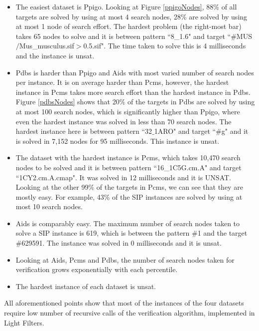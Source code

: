 \documentclass{l4proj}
\newcounter{example}[section]
\begin{document}
\begin{itemize}
\item The easiest dataset is Ppigo. Looking at Figure \ref{ppigoNodes}, 88\% of all targets are solved by using at most 4 search nodes, 28\% are solved by using at most 1 node of search effort. The hardest problem (the right-most bar) takes 65 nodes to solve and it is between pattern ``8\_1.6" and target ``\#MUS$/$Mus\_musculus.sif$>$0.5.sif". The time taken to solve this is 4 milliseconds and the instance is \gls{unsat}.

\item Pdbs is harder than Ppigo and Aids with most varied number of search nodes per instance. It is on average harder than Pcms, however, the hardest instance in Pcms takes more search effort than the hardest instance in Pdbs. Figure \ref{pdbsNodes} shows that 20\% of the targets in Pdbs are solved by using at most 100 search nodes, which is significantly higher than Ppigo, where even the hardest instance was solved in less than 70 search nodes. The hardest instance here is between pattern ``32$\_$1ARO" and target ``\#g" and it is solved in 7,152 nodes for 95 milliseconds. This instance is \gls{unsat}. 

\item The dataset with the hardest instance is Pcms, which takes 10,470 search nodes to be solved and it is between pattern ``16\_1C5G.cm.A" and target ``1CY2.cm.A.cmap". It was solved in 12 milliseconds and it is UNSAT. Looking at the other 99\% of the targets in Pcms, we can see that they are mostly easy. For example, 43\% of the SIP instances are solved by using at most 10 search nodes.

\item Aids is comparably easy. The maximum number of search nodes taken to solve a SIP instance is 619, which is between the pattern \#1 and the target \#629591. The instance was solved in 0 milliseconds and it is \gls{unsat}.

\item Looking at Aids, Pcms and Pdbs, the number of search nodes taken for verification grows exponentially with each percentile.

\item The hardest instance of each dataset is \gls{unsat}.

\end{itemize}

All aforementioned points show that most of the instances of the four datasets require low number of recursive calls of the verification algorithm, implemented in Light Filters.
\end{document}
